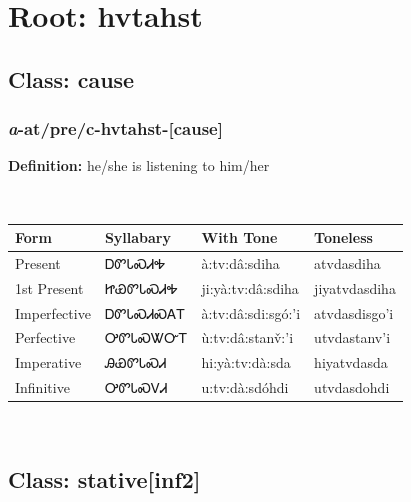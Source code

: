 \needspace{4in}
\section*{Root: hvtahst}
\nopagebreak
{}
\needspace{3in}
\subsection*{Class: cause}
\nopagebreak
\needspace{2in}
\subsubsection*{\textit{a}{-}at/pre/c{-}\textbf{hvtahst}{-}[cause]}
\nopagebreak
\textbf{Definition: } he/she is listening to him/her
\\[0.5em]
\begin{tabularx}{\textwidth}{l X X X}%
\toprule%
\textbf{Form}&\textbf{Syllabary}&\textbf{With Tone}&\textbf{Toneless}\\%
\midrule%
Present&ᎠᏛᏓᏍᏗᎭ&à:tv:dâ:sdiha&atvdasdiha\\%
1st Present&ᏥᏯᏛᏓᏍᏗᎭ&ji:yà:tv:dâ:sdiha&jiyatvdasdiha\\%
Imperfective&ᎠᏛᏓᏍᏗᏍᎪᎢ&à:tv:dâ:sdi:sgó:’i&atvdasdisgo’i\\%
Perfective&ᎤᏛᏓᏍᏔᏅᎢ&ù:tv:dâ:stanv̌:’i&utvdastanv’i\\%
Imperative&ᎯᏯᏛᏓᏍᏗ&hi:yà:tv:dà:sda&hiyatvdasda\\%
Infinitive&ᎤᏛᏓᏍᏙᏗ&u:tv:dà:sdóhdi&utvdasdohdi\\%
\bottomrule%
\end{tabularx}
\\[1em]
\needspace{3in}
\subsection*{Class: stative[inf2]}
\nopagebreak
\needspace{2in}
